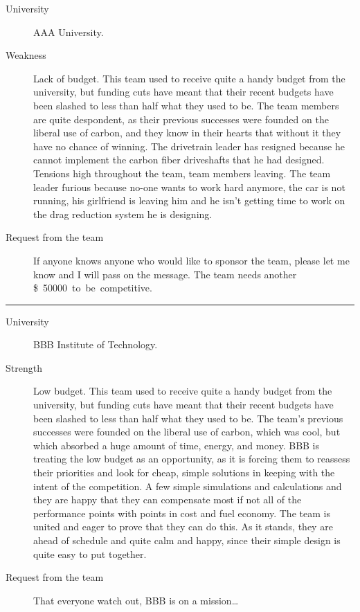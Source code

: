 \documentclass[10pt, a4paper, article, oneside, twocolumn, final]{memoir}
\begin{document}
\begin{description}
    \item[University] AAA University.
    \item[Weakness] Lack of budget. This team used to receive quite a handy budget from the university, but funding cuts have meant that their recent budgets have been slashed to less than half what they used to be. The team members are quite despondent, as their previous successes were founded on the liberal use of carbon, and they know in their hearts that without it they have no chance of winning. The drivetrain leader has resigned because he cannot implement the carbon fiber driveshafts that he had designed. Tensions high throughout the team, team members leaving. The team leader furious because no-one wants to work hard anymore, the car is not running, his girlfriend is leaving him and he isn’t getting time to work on the drag reduction system he is designing. 
    \item[Request from the team] If anyone knows anyone who would like to sponsor the team, please let me know and I will pass on the message. The team needs another \SI{50000}[\$] to be competitive.
\end{description}

\plainbreak{2}

\begin{description}
    \item[University] BBB Institute of Technology.
    \item[Strength] Low budget. This team used to receive quite a handy budget from the university, but funding cuts have meant that their recent budgets have been slashed to less than half what they used to be. The team’s previous successes were founded on the liberal use of carbon, which was cool, but which absorbed a huge amount of time, energy, and money. BBB is treating the low budget as an opportunity, as it is forcing them to reassess their priorities and look for cheap, simple solutions in keeping with the intent of the competition. A few simple simulations and calculations and they are happy that they can compensate most if not all of the performance points with points in cost and fuel economy. The team is united and eager to prove that they can do this. As it stands, they are ahead of schedule and quite calm and happy, since their simple design is quite easy to put together.    
    \item[Request from the team] That everyone watch out, BBB is on a mission\ldots
\end{description}
\end{document}
